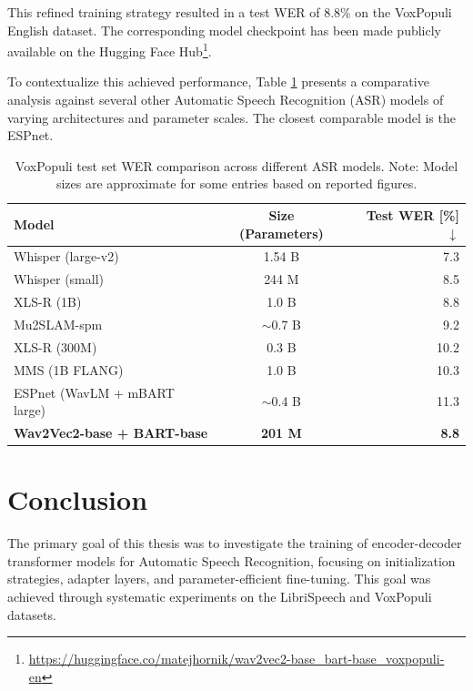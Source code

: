This refined training strategy resulted in a test WER of 8.8\% on the VoxPopuli English dataset. The corresponding model checkpoint has been made publicly available on the Hugging Face Hub\footnote{\url{https://huggingface.co/matejhornik/wav2vec2-base_bart-base_voxpopuli-en}}.

To contextualize this achieved performance, Table \ref{tab:wer_comparison_voxpopuli} presents a comparative analysis against several other Automatic Speech Recognition (ASR) models of varying architectures and parameter scales. The closest comparable model is the ESPnet.

\begin{table}[htbp]
  \centering
  \begin{tabular}{lcr}
    \toprule
    \textbf{Model} & \textbf{Size (Parameters)} & \textbf{Test WER [\%] $\downarrow$} \\
    \midrule
    Whisper (large-v2)~\cite{radford2022robust} & 1.54 B & 7.3 \\
    Whisper (small)~\cite{radford2022robust} & 244 M & 8.5 \\
    XLS-R (1B)~\cite{Babu2022XLS} & 1.0 B & 8.8 \\
    Mu2SLAM-spm~\cite{Mu2SLAM} & $\sim$0.7 B & 9.2 \\
    XLS-R (300M)~\cite{Babu2022XLS} & 0.3 B & 10.2 \\
    MMS (1B FLANG)~\cite{mms} & 1.0 B & 10.3 \\ 
    ESPnet (WavLM + mBART large)~\cite{watanabe2018espnet} & $\sim$0.4 B & 11.3 \\ 
    \midrule
    \textbf{Wav2Vec2-base + BART-base} & \textbf{201 M} & \textbf{8.8} \\
    \bottomrule
  \end{tabular}
  \caption{VoxPopuli test set WER comparison across different ASR models. Note: Model sizes are approximate for some entries based on reported figures.}
  \label{tab:wer_comparison_voxpopuli}
\end{table}



\chapter{Conclusion}\label{hastalavista}

The primary goal of this thesis was to investigate the training of encoder-decoder transformer models for Automatic Speech Recognition, focusing on initialization strategies, adapter layers, and parameter-efficient fine-tuning. This goal was achieved through systematic experiments on the LibriSpeech and VoxPopuli datasets.

